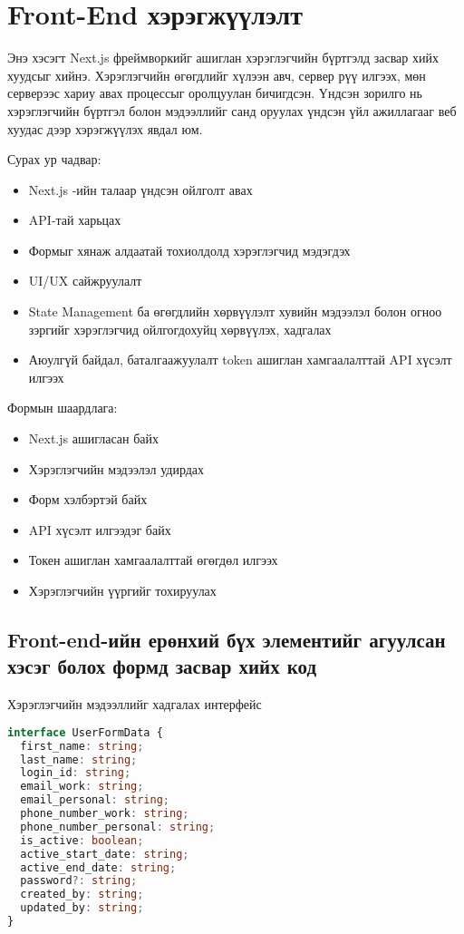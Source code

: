 \section{Front-End хэрэгжүүлэлт}
Энэ хэсэгт Next.js фреймворкийг ашиглан хэрэглэгчийн бүртгэлд засвар хийх хуудсыг хийнэ. Хэрэглэгчийн өгөгдлийг хүлээн авч, сервер рүү илгээх, мөн серверээс хариу авах процессыг оролцуулан бичигдсэн. Үндсэн зорилго нь хэрэглэгчийн бүртгэл болон мэдээллийг санд оруулах үндсэн үйл ажиллагааг веб хуудас дээр хэрэгжүүлэх явдал юм.

Сурах ур чадвар:
\begin{itemize}
	\item Next.js -ийн талаар үндсэн ойлголт авах
	\item API-тай харьцах
	\item Формыг хянаж алдаатай тохиолдолд хэрэглэгчид мэдэгдэх
	\item UI/UX сайжруулалт
	\item State Management ба өгөгдлийн хөрвүүлэлт хувийн мэдээлэл болон огноо зэргийг хэрэглэгчид ойлгогдохуйц хөрвүүлэх, хадгалах
	\item Аюулгүй байдал, баталгаажуулалт token ашиглан хамгаалалттай API хүсэлт илгээх
\end{itemize}

Формын шаардлага:
\begin{itemize}
	\item Next.js ашигласан байх
	\item Хэрэглэгчийн мэдээлэл удирдах
	\item Форм хэлбэртэй байх
	\item API хүсэлт илгээдэг байх
	\item Токен ашиглан хамгаалалттай өгөгдөл илгээх
	\item Хэрэглэгчийн үүргийг тохируулах
\end{itemize}
\pagebreak

\subsection{Front-end-ийн ерөнхий бүх элементийг агуулсан хэсэг болох формд засвар хийх код}

Хэрэглэгчийн мэдээллийг хадгалах интерфейс

\begin{lstlisting}[language=Typescript, caption=UserFormData интерфейсийг үүсгэсэн байдал, frame=single]
interface UserFormData {
  first_name: string;
  last_name: string;
  login_id: string;
  email_work: string;
  email_personal: string;
  phone_number_work: string;
  phone_number_personal: string;
  is_active: boolean;
  active_start_date: string;
  active_end_date: string;
  password?: string;
  created_by: string;
  updated_by: string;
}
\end{lstlisting}

